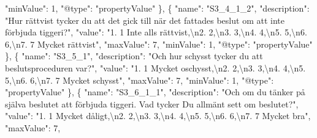 \documentclass[
]{book}
\newenvironment{Shaded}{\begin{snugshade}}{\end{snugshade}}
\newcommand{\CharTok}[1]{\textcolor[rgb]{0.31,0.60,0.02}{#1}}
\newcommand{\DataTypeTok}[1]{\textcolor[rgb]{0.13,0.29,0.53}{#1}}
\newcommand{\DecValTok}[1]{\textcolor[rgb]{0.00,0.00,0.81}{#1}}
\newcommand{\FunctionTok}[1]{\textcolor[rgb]{0.00,0.00,0.00}{#1}}
\newcommand{\OtherTok}[1]{\textcolor[rgb]{0.56,0.35,0.01}{#1}}
\newcommand{\StringTok}[1]{\textcolor[rgb]{0.31,0.60,0.02}{#1}}
\begin{document}
\begin{Shaded}
\begin{Highlighting}[]
      \DataTypeTok{"minValue"}\FunctionTok{:} \DecValTok{1}\FunctionTok{,}
      \DataTypeTok{"@type"}\FunctionTok{:} \StringTok{"propertyValue"}
    \FunctionTok{\}}\OtherTok{,}
    \FunctionTok{\{}
      \DataTypeTok{"name"}\FunctionTok{:} \StringTok{"S3_4_1_2"}\FunctionTok{,}
      \DataTypeTok{"description"}\FunctionTok{:} \StringTok{"Hur rättvist tycker du att det gick till när det fattades beslut om att inte förbjuda tiggeri?"}\FunctionTok{,}
      \DataTypeTok{"value"}\FunctionTok{:} \StringTok{"1. 1 Inte alls rättvist,}\CharTok{\textbackslash{}n}\StringTok{2. 2,}\CharTok{\textbackslash{}n}\StringTok{3. 3,}\CharTok{\textbackslash{}n}\StringTok{4. 4,}\CharTok{\textbackslash{}n}\StringTok{5. 5,}\CharTok{\textbackslash{}n}\StringTok{6. 6,}\CharTok{\textbackslash{}n}\StringTok{7. 7 Mycket rättvist"}\FunctionTok{,}
      \DataTypeTok{"maxValue"}\FunctionTok{:} \DecValTok{7}\FunctionTok{,}
      \DataTypeTok{"minValue"}\FunctionTok{:} \DecValTok{1}\FunctionTok{,}
      \DataTypeTok{"@type"}\FunctionTok{:} \StringTok{"propertyValue"}
    \FunctionTok{\}}\OtherTok{,}
    \FunctionTok{\{}
      \DataTypeTok{"name"}\FunctionTok{:} \StringTok{"S3_5_1"}\FunctionTok{,}
      \DataTypeTok{"description"}\FunctionTok{:} \StringTok{"Och hur schysst tycker du att beslutsproceduren var?"}\FunctionTok{,}
      \DataTypeTok{"value"}\FunctionTok{:} \StringTok{"1. 1 Mycket oschysst,}\CharTok{\textbackslash{}n}\StringTok{2. 2,}\CharTok{\textbackslash{}n}\StringTok{3. 3,}\CharTok{\textbackslash{}n}\StringTok{4. 4,}\CharTok{\textbackslash{}n}\StringTok{5. 5,}\CharTok{\textbackslash{}n}\StringTok{6. 6,}\CharTok{\textbackslash{}n}\StringTok{7. 7 Mycket schysst"}\FunctionTok{,}
      \DataTypeTok{"maxValue"}\FunctionTok{:} \DecValTok{7}\FunctionTok{,}
      \DataTypeTok{"minValue"}\FunctionTok{:} \DecValTok{1}\FunctionTok{,}
      \DataTypeTok{"@type"}\FunctionTok{:} \StringTok{"propertyValue"}
    \FunctionTok{\}}\OtherTok{,}
    \FunctionTok{\{}
      \DataTypeTok{"name"}\FunctionTok{:} \StringTok{"S3_6_1_1"}\FunctionTok{,}
      \DataTypeTok{"description"}\FunctionTok{:} \StringTok{"Och om du tänker på själva beslutet att förbjuda tiggeri. Vad tycker Du allmänt sett om beslutet?"}\FunctionTok{,}
      \DataTypeTok{"value"}\FunctionTok{:} \StringTok{"1. 1 Mycket dåligt,}\CharTok{\textbackslash{}n}\StringTok{2. 2,}\CharTok{\textbackslash{}n}\StringTok{3. 3,}\CharTok{\textbackslash{}n}\StringTok{4. 4,}\CharTok{\textbackslash{}n}\StringTok{5. 5,}\CharTok{\textbackslash{}n}\StringTok{6. 6,}\CharTok{\textbackslash{}n}\StringTok{7. 7 Mycket bra"}\FunctionTok{,}
      \DataTypeTok{"maxValue"}\FunctionTok{:} \DecValTok{7}\FunctionTok{,}

\end{Highlighting}
\end{Shaded}
\end{document}
